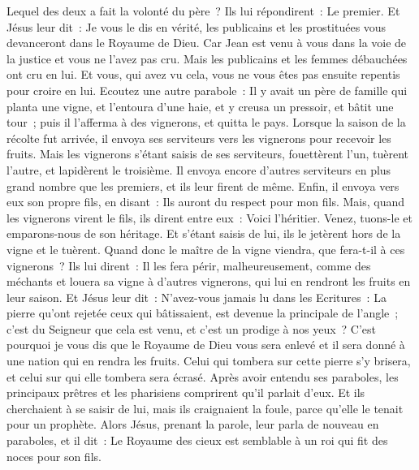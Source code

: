 \begin{multicols}{2}
Lequel des deux a fait la volonté du père~? Ils lui répondirent~: Le premier. Et Jésus leur dit~: Je vous le dis en vérité, les publicains et les prostituées vous devanceront dans le Royaume de Dieu.
Car Jean est venu à vous dans la voie de la justice et vous ne l'avez pas cru. Mais les publicains et les femmes débauchées ont cru en lui. Et vous, qui avez vu cela, vous ne vous êtes pas ensuite repentis pour croire en lui.
Ecoutez une autre parabole~: Il y avait un père de famille qui planta une vigne, et l'entoura d'une haie, et y creusa un pressoir, et bâtit une tour~; puis il l'afferma à des vignerons, et quitta le pays.
Lorsque la saison de la récolte fut arrivée, il envoya ses serviteurs vers les vignerons pour recevoir les fruits.
Mais les vignerons s'étant saisis de ses serviteurs, fouettèrent l'un, tuèrent l'autre, et lapidèrent le troisième.
Il envoya encore d'autres serviteurs en plus grand nombre que les premiers, et ils leur firent de même.
Enfin, il envoya vers eux son propre fils, en disant~: Ils auront du respect pour mon fils.
Mais, quand les vignerons virent le fils, ils dirent entre eux~: Voici l'héritier. Venez, tuons-le et emparons-nous de son héritage.
Et s'étant saisis de lui, ils le jetèrent hors de la vigne et le tuèrent.
Quand donc le maître de la vigne viendra, que fera-t-il à ces vignerons~?
Ils lui dirent~: Il les fera périr, malheureusement, comme des méchants et louera sa vigne à d'autres vignerons, qui lui en rendront les fruits en leur saison.
Et Jésus leur dit~: N'avez-vous jamais lu dans les Ecritures~: La pierre qu'ont rejetée ceux qui bâtissaient, est devenue la principale de l'angle~; c'est du Seigneur que cela est venu, et c'est un prodige à nos yeux~?
C'est pourquoi je vous dis que le Royaume de Dieu vous sera enlevé et il sera donné à une nation qui en rendra les fruits.
Celui qui tombera sur cette pierre s'y brisera, et celui sur qui elle tombera sera écrasé.
Après avoir entendu ses paraboles, les principaux prêtres et les pharisiens comprirent qu'il parlait d'eux.
Et ils cherchaient à se saisir de lui, mais ils craignaient la foule, parce qu'elle le tenait pour un prophète.
\VerseOne{}Alors Jésus, prenant la parole, leur parla de nouveau en paraboles, et il dit~:
Le Royaume des cieux est semblable à un roi qui fit des noces pour son fils.

\end{multicols}
